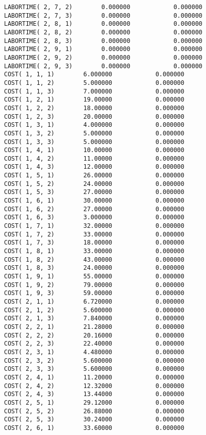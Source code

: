 \documentclass[12pt]{article}
\begin{document}
\begin{appendices}
\begin{lstlisting}
LABORTIME( 2, 7, 2)        0.000000            0.000000
LABORTIME( 2, 7, 3)        0.000000            0.000000
LABORTIME( 2, 8, 1)        0.000000            0.000000
LABORTIME( 2, 8, 2)        0.000000            0.000000
LABORTIME( 2, 8, 3)        0.000000            0.000000
LABORTIME( 2, 9, 1)        0.000000            0.000000
LABORTIME( 2, 9, 2)        0.000000            0.000000
LABORTIME( 2, 9, 3)        0.000000            0.000000
COST( 1, 1, 1)        6.000000            0.000000
COST( 1, 1, 2)        5.000000            0.000000
COST( 1, 1, 3)        7.000000            0.000000
COST( 1, 2, 1)        19.00000            0.000000
COST( 1, 2, 2)        18.00000            0.000000
COST( 1, 2, 3)        20.00000            0.000000
COST( 1, 3, 1)        4.000000            0.000000
COST( 1, 3, 2)        5.000000            0.000000
COST( 1, 3, 3)        5.000000            0.000000
COST( 1, 4, 1)        10.00000            0.000000
COST( 1, 4, 2)        11.00000            0.000000
COST( 1, 4, 3)        12.00000            0.000000
COST( 1, 5, 1)        26.00000            0.000000
COST( 1, 5, 2)        24.00000            0.000000
COST( 1, 5, 3)        27.00000            0.000000
COST( 1, 6, 1)        30.00000            0.000000
COST( 1, 6, 2)        27.00000            0.000000
COST( 1, 6, 3)        3.000000            0.000000
COST( 1, 7, 1)        32.00000            0.000000
COST( 1, 7, 2)        33.00000            0.000000
COST( 1, 7, 3)        18.00000            0.000000
COST( 1, 8, 1)        33.00000            0.000000
COST( 1, 8, 2)        43.00000            0.000000
COST( 1, 8, 3)        24.00000            0.000000
COST( 1, 9, 1)        55.00000            0.000000
COST( 1, 9, 2)        79.00000            0.000000
COST( 1, 9, 3)        59.00000            0.000000
COST( 2, 1, 1)        6.720000            0.000000
COST( 2, 1, 2)        5.600000            0.000000
COST( 2, 1, 3)        7.840000            0.000000
COST( 2, 2, 1)        21.28000            0.000000
COST( 2, 2, 2)        20.16000            0.000000
COST( 2, 2, 3)        22.40000            0.000000
COST( 2, 3, 1)        4.480000            0.000000
COST( 2, 3, 2)        5.600000            0.000000
COST( 2, 3, 3)        5.600000            0.000000
COST( 2, 4, 1)        11.20000            0.000000
COST( 2, 4, 2)        12.32000            0.000000
COST( 2, 4, 3)        13.44000            0.000000
COST( 2, 5, 1)        29.12000            0.000000
COST( 2, 5, 2)        26.88000            0.000000
COST( 2, 5, 3)        30.24000            0.000000
COST( 2, 6, 1)        33.60000            0.000000

\end{lstlisting}
\end{appendices}
\end{document}
